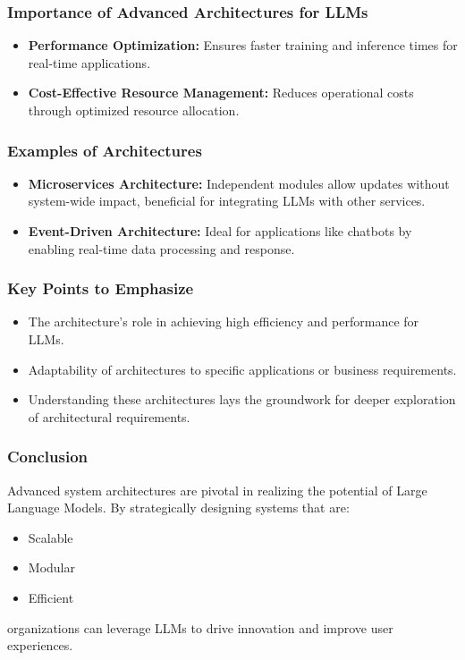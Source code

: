 \documentclass[aspectratio=169]{beamer}
\begin{document}
\begin{frame}[fragile]
    \frametitle{Importance of Advanced Architectures for LLMs}
    \begin{itemize}
        \item \textbf{Performance Optimization:} Ensures faster training and inference times for real-time applications.
        \item \textbf{Cost-Effective Resource Management:} Reduces operational costs through optimized resource allocation.
    \end{itemize}
\end{frame}

\begin{frame}[fragile]
    \frametitle{Examples of Architectures}
    \begin{itemize}
        \item \textbf{Microservices Architecture:} Independent modules allow updates without system-wide impact, beneficial for integrating LLMs with other services.
        \item \textbf{Event-Driven Architecture:} Ideal for applications like chatbots by enabling real-time data processing and response.
    \end{itemize}
\end{frame}

\begin{frame}[fragile]
    \frametitle{Key Points to Emphasize}
    \begin{itemize}
        \item The architecture's role in achieving high efficiency and performance for LLMs.
        \item Adaptability of architectures to specific applications or business requirements.
        \item Understanding these architectures lays the groundwork for deeper exploration of architectural requirements.
    \end{itemize}
\end{frame}

\begin{frame}[fragile]
    \frametitle{Conclusion}
    Advanced system architectures are pivotal in realizing the potential of Large Language Models. 
    By strategically designing systems that are:
    \begin{itemize}
        \item Scalable
        \item Modular
        \item Efficient
    \end{itemize}
    organizations can leverage LLMs to drive innovation and improve user experiences.
\end{frame}
\end{document}
